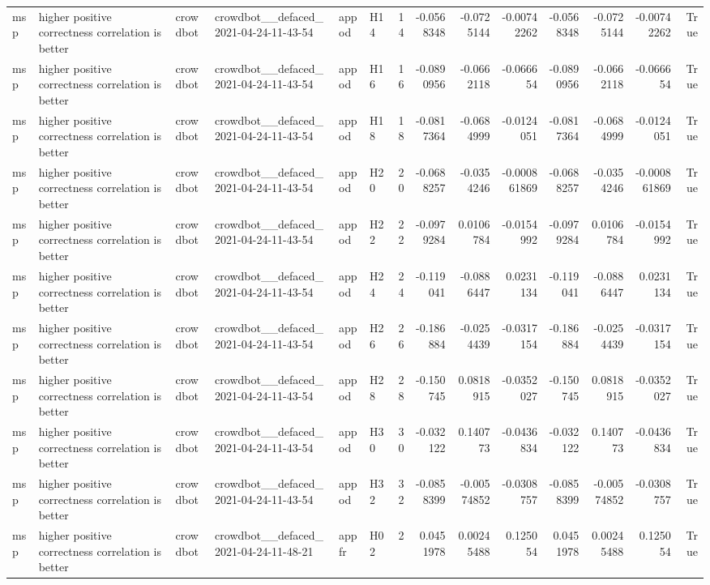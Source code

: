 \begin{longtable}{llllllrrrrrrrr}
msp & higher positive correctness correlation is better & crowdbot & crowdbot\_\_defaced\_2021-04-24-11-43-54 & appod & H14 & 14 & -0.0568348 & -0.0725144 & -0.00742262 & -0.0568348 & -0.0725144 & -0.00742262 & True \\
msp & higher positive correctness correlation is better & crowdbot & crowdbot\_\_defaced\_2021-04-24-11-43-54 & appod & H16 & 16 & -0.0890956 & -0.0662118 & -0.066654 & -0.0890956 & -0.0662118 & -0.066654 & True \\
msp & higher positive correctness correlation is better & crowdbot & crowdbot\_\_defaced\_2021-04-24-11-43-54 & appod & H18 & 18 & -0.0817364 & -0.0684999 & -0.0124051 & -0.0817364 & -0.0684999 & -0.0124051 & True \\
msp & higher positive correctness correlation is better & crowdbot & crowdbot\_\_defaced\_2021-04-24-11-43-54 & appod & H20 & 20 & -0.0688257 & -0.0354246 & -0.000861869 & -0.0688257 & -0.0354246 & -0.000861869 & True \\
msp & higher positive correctness correlation is better & crowdbot & crowdbot\_\_defaced\_2021-04-24-11-43-54 & appod & H22 & 22 & -0.0979284 & 0.0106784 & -0.0154992 & -0.0979284 & 0.0106784 & -0.0154992 & True \\
msp & higher positive correctness correlation is better & crowdbot & crowdbot\_\_defaced\_2021-04-24-11-43-54 & appod & H24 & 24 & -0.119041 & -0.0886447 & 0.0231134 & -0.119041 & -0.0886447 & 0.0231134 & True \\
msp & higher positive correctness correlation is better & crowdbot & crowdbot\_\_defaced\_2021-04-24-11-43-54 & appod & H26 & 26 & -0.186884 & -0.0254439 & -0.0317154 & -0.186884 & -0.0254439 & -0.0317154 & True \\
msp & higher positive correctness correlation is better & crowdbot & crowdbot\_\_defaced\_2021-04-24-11-43-54 & appod & H28 & 28 & -0.150745 & 0.0818915 & -0.0352027 & -0.150745 & 0.0818915 & -0.0352027 & True \\
msp & higher positive correctness correlation is better & crowdbot & crowdbot\_\_defaced\_2021-04-24-11-43-54 & appod & H30 & 30 & -0.032122 & 0.140773 & -0.0436834 & -0.032122 & 0.140773 & -0.0436834 & True \\
msp & higher positive correctness correlation is better & crowdbot & crowdbot\_\_defaced\_2021-04-24-11-43-54 & appod & H32 & 32 & -0.0858399 & -0.00574852 & -0.0308757 & -0.0858399 & -0.00574852 & -0.0308757 & True \\
msp & higher positive correctness correlation is better & crowdbot & crowdbot\_\_defaced\_2021-04-24-11-48-21 & appfr & H02 & 2 & 0.0451978 & 0.00245488 & 0.125054 & 0.0451978 & 0.00245488 & 0.125054 & True \\

\end{longtable}
